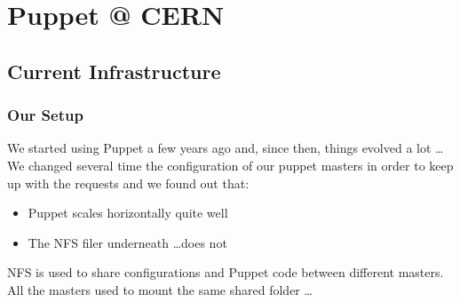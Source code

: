 \documentclass[aspectratio=169]{beamer}
\begin{document}
\section{Puppet @ CERN}

\subsection{Current Infrastructure}
\begin{frame}
    \frametitle{Our Setup}
    We started using Puppet a few years ago and, since then, 
    things evolved a lot \ldots \\
    \vspace{1em}
    We changed several time the configuration of our puppet masters in order 
    to keep up with the requests and we found out that:
    
    \begin{itemize}
        \item Puppet scales horizontally quite well
        \item The NFS filer underneath \ldots does not
    \end{itemize}
    \vspace{1em}
    NFS is used to share configurations and Puppet code between 
    different masters. \\
    All the masters used to mount the same shared folder \ldots
\end{frame}

\end{document}

